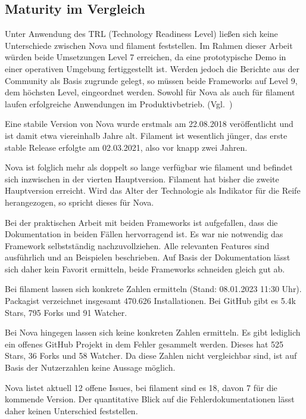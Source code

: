 \subsection{Maturity im Vergleich}
Unter Anwendung des TRL (Technology Readiness Level) ließen sich keine Unterschiede zwischen Nova und filament feststellen.
Im Rahmen dieser Arbeit würden beide Umsetzungen Level 7 erreichen, da eine prototypische Demo in einer operativen Umgebung fertiggestellt ist.
Werden jedoch die Berichte aus der Community als Basis zugrunde gelegt, so müssen beide Frameworks auf Level 9, dem höchsten Level, eingeordnet werden.
Sowohl für Nova als auch für filament laufen erfolgreiche Anwendungen im Produktivbetrieb.
(Vgl.~\cite{technology-readiness})

Eine stabile Version von Nova wurde erstmals am 22.08.2018\cite{nova-releases} veröffentlicht und ist damit etwa viereinhalb Jahre alt.
Filament ist wesentlich jünger, das erste stable Release erfolgte am 02.03.2021\cite{filament-releases}, also vor knapp zwei Jahren.

Nova ist folglich mehr als doppelt so lange verfügbar wie filament und befindet sich inzwischen in der vierten Hauptversion\cite{nova-releases}.
Filament hat bisher die zweite Hauptversion\cite{filament-releases} erreicht.
Wird das Alter der Technologie als Indikator für die Reife herangezogen, so spricht dieses für Nova.

Bei der praktischen Arbeit mit beiden Frameworks ist aufgefallen, dass die Dokumentation in beiden Fällen hervorragend ist.
Es war nie notwendig das Framework selbstständig nachzuvollziehen.
Alle relevanten Features sind ausführlich und an Beispielen beschrieben.
Auf Basis der Dokumentation lässt sich daher kein Favorit ermitteln, beide Frameworks schneiden gleich gut ab.

Bei filament lassen sich konkrete Zahlen ermitteln (Stand: 08.01.2023 11:30 Uhr).
Packagist verzeichnet insgesamt 470.626 Installationen.
Bei GitHub gibt es 5.4k Stars, 795 Forks und 91 Watcher.

Bei Nova hingegen lassen sich keine konkreten Zahlen ermitteln.
Es gibt lediglich ein offenes GitHub Projekt in dem Fehler gesammelt werden.
Dieses hat 525 Stars, 36 Forks und 58 Watcher.
Da diese Zahlen nicht vergleichbar sind, ist auf Basis der Nutzerzahlen keine Aussage möglich.

Nova listet aktuell 12 offene Issues, bei filament sind es 18, davon 7 für die kommende Version.
Der quantitative Blick auf die Fehlerdokumentationen lässt daher keinen Unterschied feststellen.

